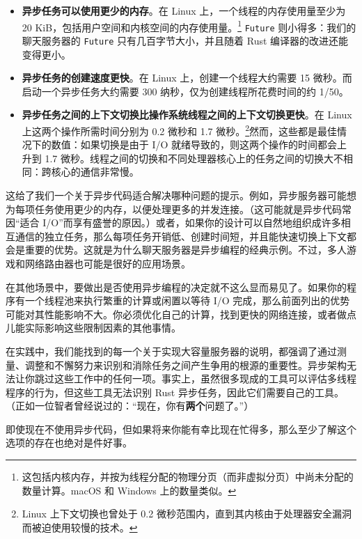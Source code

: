 \begin{itemize}
\item \textbf{异步任务可以使用更少的内存}。在 Linux 上，一个线程的内存使用量至少为 20 KiB，包括用户空间和内核空间的内存使用量。\footnote{这包括内核内存，并按为线程分配的物理分页（而非虚拟分页）中尚未分配的数量计算。macOS 和 Windows 上的数量类似。} \texttt{Future} 则小得多：我们的聊天服务器的 \texttt{Future} 只有几百字节大小，并且随着 Rust 编译器的改进还能变得更小。
\item \textbf{异步任务的创建速度更快}。在 Linux 上，创建一个线程大约需要 15 微秒。而启动一个异步任务大约需要 300 纳秒，仅为创建线程所花费时间的约 1/50。
\item \textbf{异步任务之间的上下文切换比操作系统线程之间的上下文切换更快}。在 Linux 上这两个操作所需时间分别为 0.2 微秒和 1.7 微秒。\footnote{Linux 上下文切换也曾处于 0.2 微秒范围内，直到其内核由于处理器安全漏洞而被迫使用较慢的技术。}然而，这些都是最佳情况下的数值：如果切换是由于 I/O 就绪导致的，则这两个操作的时间都会上升到 1.7 微秒。线程之间的切换和不同处理器核心上的任务之间的切换大不相同：跨核心的通信非常慢。
\end{itemize}

这给了我们一个关于异步代码适合解决哪种问题的提示。例如，异步服务器可能想为每项任务使用更少的内存，以便处理更多的并发连接。（这可能就是异步代码常因“适合 I/O”而享有盛誉的原因。）或者，如果你的设计可以自然地组织成许多相互通信的独立任务，那么每项任务开销低、创建时间短，并且能快速切换上下文都会是重要的优势。这就是为什么聊天服务器是异步编程的经典示例。不过，多人游戏和网络路由器也可能是很好的应用场景。

在其他场景中，要做出是否使用异步编程的决定就不这么显而易见了。如果你的程序有一个线程池来执行繁重的计算或闲置以等待 I/O 完成，那么前面列出的优势可能对其性能影响不大。你必须优化自己的计算，找到更快的网络连接，或者做点儿能实际影响这些限制因素的其他事情。

在实践中，我们能找到的每一个关于实现大容量服务器的说明，都强调了通过测量、调整和不懈努力来识别和消除任务之间产生争用的根源的重要性。异步架构无法让你跳过这些工作中的任何一项。事实上，虽然很多现成的工具可以评估多线程程序的行为，但这些工具无法识别 Rust 异步任务，因此它们需要自己的工具。（正如一位智者曾经说过的：“现在，你有\textbf{两个}问题了。”）

即使现在不使用异步代码，但如果将来你能有幸比现在忙得多，那么至少了解这个选项的存在也绝对是件好事。

